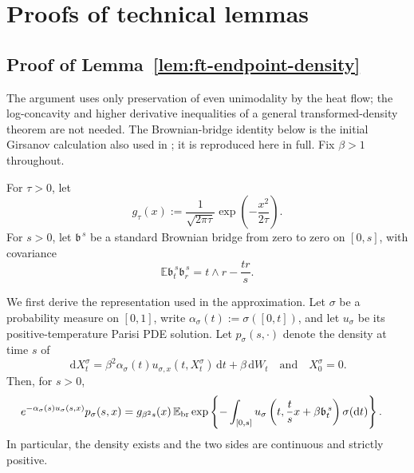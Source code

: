\documentclass[10pt]{amsart}
\theoremstyle{definition}
\theoremstyle{remark}
\numberwithin{equation}{section}
\newcommand{\E}{\mathbb E}
\newcommand{\1}{\mathbf 1}
\newcommand{\dd}{\,\mathrm d}
\begin{document}
\section{Proofs of technical lemmas}
\label{app:technical-lemmas}




\subsection{Proof of Lemma~\ref{lem:ft-endpoint-density}}
\label{app:ft-endpoint-density}

The argument uses only preservation of even unimodality by the heat flow; the log-concavity and higher derivative inequalities of a general transformed-density theorem are not needed.  The Brownian-bridge identity below is the initial Girsanov calculation also used in \cite[proof of Proposition~7.1]{Lopatto2026}; it is reproduced here in full.  Fix $\beta>1$ throughout.

For $\tau>0$, let
\begin{equation}
 g_\tau(x):=\frac1{\sqrt{2\pi\tau}}
 \exp\left(-\frac{x^2}{2\tau}\right).
 \label{eq:app-ft-Gaussian-kernel}
\end{equation}
For $s>0$, let $\mathfrak b^{\,s}$ be a standard Brownian bridge from zero to zero on $[0,s]$, with covariance
\begin{equation*}
 \E\mathfrak b_t^{\,s}\mathfrak b_r^{\,s}
 =t\wedge r-\frac{tr}{s}.
\end{equation*}

We first derive the representation used in the approximation.  Let $\sigma$ be a probability measure on $[0,1]$, write $\alpha_\sigma(t):=\sigma([0,t])$, and let $u_\sigma$ be its positive-temperature Parisi PDE solution.  Let $p_\sigma(s,\cdot)$ denote the density at time $s$ of
\begin{equation*}
 \dd X_t^\sigma
 =\beta^2\alpha_\sigma(t)
   u_{\sigma,x}(t,X_t^\sigma)\dd t+\beta\dd W_t
 \quad\text{and}\quad X_0^\sigma=0.
\end{equation*}
Then, for $s>0$,
\begin{align}
 &e^{-\alpha_\sigma(s)u_\sigma(s,x)}p_\sigma(s,x)
 =g_{\beta^2s}(x)\,
 \E_{\rm br}\exp\left\{
 -\int_{[0,s]}u_\sigma\left(
 t,\frac tsx+\beta\mathfrak b_t^{\,s}
 \right)\sigma(\mathrm d t)
 \right\}.
 \label{eq:app-ft-bridge-representation}
\end{align}
In particular, the density exists and the two sides are continuous and strictly positive.
\end{document}
